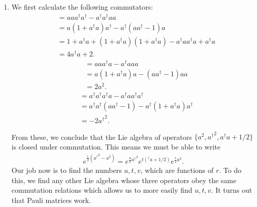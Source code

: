 \documentclass{article}
\theoremstyle{definition}
\newcommand{\f}[2]{\frac{#1}{#2}}
\begin{document}
\begin{enumerate}[label=(\alph*)]

\item We first calculate the following commutators:
\begin{align*}
[a^2, {a^\dagger}^2] 
&=   aa a^\dagger a^\dagger - a^\dagger a^\dagger a a \\
&= a(1+a^\dagger a) a^\dagger - a^\dagger (aa^\dagger - 1) a \\
&= 1 + a^\dagger a + (1+a^\dagger a)(1 + a^\dagger a ) - a^\dagger a a^\dagger a + a^\dagger a \\
&= 4a^\dagger a + 2. 
\end{align*}
\begin{align*}
[a^2, a^\dagger a ] 
&= aaa^\dagger a - a^\dagger a a a  \\
&= a(1+a^\dagger a) a - (aa^\dagger -1) aa \\
&= 2a^2.
\end{align*}
\begin{align*}
[{a^\dagger}^2 , a^\dagger a] 
&= a^\dagger a^\dagger a^\dagger a  - a^\dagger a a^\dagger a^\dagger \\
&= a^\dagger a^\dagger (aa^\dagger - 1) - a^\dagger (1 + a^\dagger a) a^\dagger \\
&= -2{a^\dagger}^2.
\end{align*}

From these, we conclude that the Lie algebra of operators $\{  a^2, {a^\dagger}^2, a^\dagger a + 1/2  \}$ is closed under commutation. This means we must be able to write
\begin{align*}
e^{\f{r}{2} ({a^\dagger}^2 - a^2)  } = e^{\f{u}{2} {a^\dagger}^2} e^{t(^\dagger a + 1/2)} e^{\f{v}{2}a^2}. 
\end{align*}
Our job now is to find the numbers $u,t,v$, which are functions of $r$. To do this, we find any other Lie algebra whose three operators obey the same commutation relations which allows us to more easily find $u,t,v$. It turns out that Pauli matrices work. 


\end{enumerate}
\end{document}
